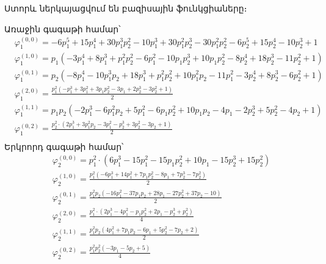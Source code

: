 \documentclass[fleqn, bachelor,subf,12pt,notitlepage]{article}
\begin{document}
Ստորև ներկայացվում են բազիսային ֆունկցիաները։

Առաջին գագաթի համար՝
\begin{equation}
\begin{aligned}
&\varphi_{1}^{(0,0)}=- 6 p_{1}^{5} + 15 p_{1}^{4} + 30 p_{1}^{3} p_{2}^{2} - 10 p_{1}^{3} + 30 p_{1}^{2} p_{2}^{3} - 30 p_{1}^{2} p_{2}^{2} - 6 p_{2}^{5} + 15 p_{2}^{4} - 10 p_{2}^{3} + 1 \\
&\varphi_{1}^{(1,0)}=p_{1} \left(- 3 p_{1}^{4} + 8 p_{1}^{3} + p_{1}^{2} p_{2}^{2} - 6 p_{1}^{2} - 10 p_{1} p_{2}^{3} + 10 p_{1} p_{2}^{2} - 8 p_{2}^{4} + 18 p_{2}^{3} - 11 p_{2}^{2} + 1\right) \\
&\varphi_{1}^{(0,1)}=p_{2} \left(- 8 p_{1}^{4} - 10 p_{1}^{3} p_{2} + 18 p_{1}^{3} + p_{1}^{2} p_{2}^{2} + 10 p_{1}^{2} p_{2} - 11 p_{1}^{2} - 3 p_{2}^{4} + 8 p_{2}^{3} - 6 p_{2}^{2} + 1\right) \\
&\varphi_{1}^{(2,0)}=\frac{p_{1}^{2} \left(- p_{1}^{3} + 3 p_{1}^{2} + 3 p_{1} p_{2}^{2} - 3 p_{1} + 2 p_{2}^{3} - 3 p_{2}^{2} + 1\right)}{2} \\
&\varphi_{1}^{(1,1)}=p_{1} p_{2} \left(- 2 p_{1}^{3} - 6 p_{1}^{2} p_{2} + 5 p_{1}^{2} - 6 p_{1} p_{2}^{2} + 10 p_{1} p_{2} - 4 p_{1} - 2 p_{2}^{3} + 5 p_{2}^{2} - 4 p_{2} + 1\right) \\
&\varphi_{1}^{(0,2)}=\frac{p_{2}^{2} \cdot \left(2 p_{1}^{3} + 3 p_{1}^{2} p_{2} - 3 p_{1}^{2} - p_{2}^{3} + 3 p_{2}^{2} - 3 p_{2} + 1\right)}{2} \\
\end{aligned}
\end{equation}
Երկրորդ գագաթի համար՝
\begin{equation}
\begin{aligned}
&\varphi_{2}^{(0,0)}=p_{1}^{2} \cdot \left(6 p_{1}^{3} - 15 p_{1}^{2} - 15 p_{1} p_{2}^{2} + 10 p_{1} - 15 p_{2}^{3} + 15 p_{2}^{2}\right) \\
&\varphi_{2}^{(1,0)}=\frac{p_{1}^{2} \left(- 6 p_{1}^{3} + 14 p_{1}^{2} + 7 p_{1} p_{2}^{2} - 8 p_{1} + 7 p_{2}^{3} - 7 p_{2}^{2}\right)}{2} \\
&\varphi_{2}^{(0,1)}=\frac{p_{1}^{2} p_{2} \left(- 16 p_{1}^{2} - 37 p_{1} p_{2} + 28 p_{1} - 27 p_{2}^{2} + 37 p_{2} - 10\right)}{2} \\
&\varphi_{2}^{(2,0)}=\frac{p_{1}^{2} \cdot \left(2 p_{1}^{3} - 4 p_{1}^{2} - p_{1} p_{2}^{2} + 2 p_{1} - p_{2}^{3} + p_{2}^{2}\right)}{4} \\
&\varphi_{2}^{(1,1)}=\frac{p_{1}^{2} p_{2} \left(4 p_{1}^{2} + 7 p_{1} p_{2} - 6 p_{1} + 5 p_{2}^{2} - 7 p_{2} + 2\right)}{2} \\
&\varphi_{2}^{(0,2)}=\frac{p_{1}^{2} p_{2}^{2} \left(- 3 p_{1} - 5 p_{2} + 5\right)}{4} \\
\end{aligned}
\end{equation}
\end{document}
